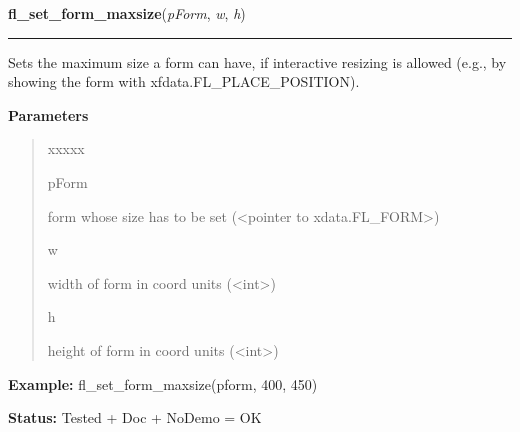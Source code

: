 \hspace{.8\funcindent}\begin{boxedminipage}{\funcwidth}

    \raggedright \textbf{fl\_set\_form\_maxsize}(\textit{pForm}, \textit{w}, \textit{h})

    \vspace{-1.5ex}

    \rule{\textwidth}{0.5\fboxrule}
\setlength{\parskip}{2ex}
    Sets the maximum size a form can have, if interactive resizing is 
    allowed (e.g., by showing the form with xfdata.FL\_PLACE\_POSITION).

\setlength{\parskip}{1ex}
      \textbf{Parameters}
      \vspace{-1ex}

      \begin{quote}
        \begin{Ventry}{xxxxx}

          \item[pForm]

          form whose size has to be set ({\textless}pointer to 
          xdata.FL\_FORM{\textgreater})

          \item[w]

          width of form in coord units ({\textless}int{\textgreater})

          \item[h]

          height of form in coord units ({\textless}int{\textgreater})

        \end{Ventry}

      \end{quote}

\textbf{Example:} fl\_set\_form\_maxsize(pform, 400, 450)



\textbf{Status:} Tested + Doc + NoDemo = OK



    \end{boxedminipage}

    \label{xformslib:library:fl_set_form_event_cmask}

    \vspace{0.5ex}

